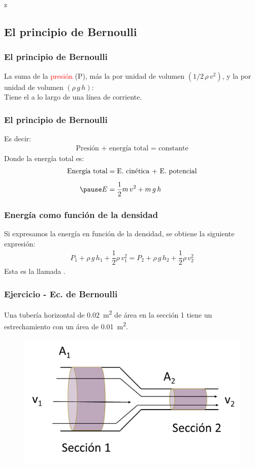 z\documentclass[14pt]{beamer}
\begin{document}
\subsection{El principio de Bernoulli}

\begin{frame}
\frametitle{El principio de Bernoulli}
La suma de la \textcolor{red}{presión} (P), más la  por unidad de volumen $(1/2 \, \rho \, v^{2})$, y la  por unidad de volumen $(\rho \, g \, h)$:
\\
\bigskip
\pause
Tiene el  a lo largo de una línea de corriente.
\end{frame}
\begin{frame}
\frametitle{El principio de Bernoulli}
Es decir:
\pause
\begin{align*}
\text{Presión + energía total = constante} 
\end{align*}
\pause
Donde la energía total es:
\pause
\begin{eqnarray*}
\begin{aligned}
\text{Energía total} &= \text{E. cinética + E. potencial} \\[0.5em] \pause
E &= \dfrac{1}{2} m \, v^{2} + m \, g \, h
\end{aligned}
\end{eqnarray*}
\end{frame}
\begin{frame}
\frametitle{Energía como función de la densidad}
Si expresamos la energía en función de la densidad, se obtiene la siguiente expresión:
\pause
\begin{align*}
P_{1} + \rho \, g \, h_{1} + \dfrac{1}{2} \rho \, v_{1}^{2} = P_{2} + \rho \, g \, h_{2} + \dfrac{1}{2} \rho \, v_{2}^{2}
\end{align*}
Esta es la llamada .
\end{frame}
\begin{frame}
\frametitle{Ejercicio - Ec. de Bernoulli}
Una tubería horizontal de \SI{0.02}{\square\meter} de área en la sección 1 tiene un estrechamiento con un área de \SI{0.01}{\square\meter}. 
\begin{figure}
    \centering
    \includegraphics[scale=0.8]{Imagenes/Ejercicio_Bernoulli_01.png}
\end{figure}
\end{frame}
\end{document}
